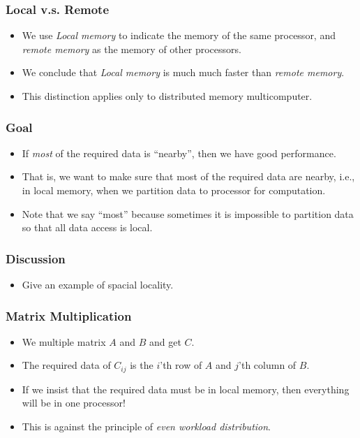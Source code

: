 \documentclass{beamer}
\begin{document}
\begin{CJK}{UTF8}{bsmi}
\begin{frame}
\frametitle{Local v.s. Remote}
\begin{itemize}
\item We use {\em Local memory} to indicate the memory of the same
  processor, and {\em remote memory} as the memory of other
  processors.
\item We conclude that {\em Local memory} is much much faster than
  {\em remote memory}.
\item This distinction applies only to distributed memory
  multicomputer.
\end{itemize}
\end{frame}

\begin{frame}
\frametitle{Goal}
\begin{itemize}
\item If {\em most} of the required data is ``nearby'', then we have
  good performance.
\item That is, we want to make sure that most of the required data are
  nearby, i.e., in local memory, when we partition data to processor
  for computation.
\item Note that we say ``most'' because sometimes it is impossible to
  partition data so that all data access is local.
\end{itemize}
\end{frame}

\begin{frame}
\frametitle{Discussion}
\begin{itemize}
\item Give an example of spacial locality.
\end{itemize}
\end{frame}

\begin{frame}
\frametitle{Matrix Multiplication}
\begin{itemize}
\item We multiple matrix $A$ and $B$ and get $C$.
\item The required data of $C_{ij}$ is the $i$'th row of $A$ and
  $j$'th column of $B$.  
\item If we insist that the required data must be in local memory,
  then everything will be in one processor!
\item This is against the principle of {\em even workload distribution}.
\end{itemize}
\end{frame}


\end{CJK}
\end{document}

